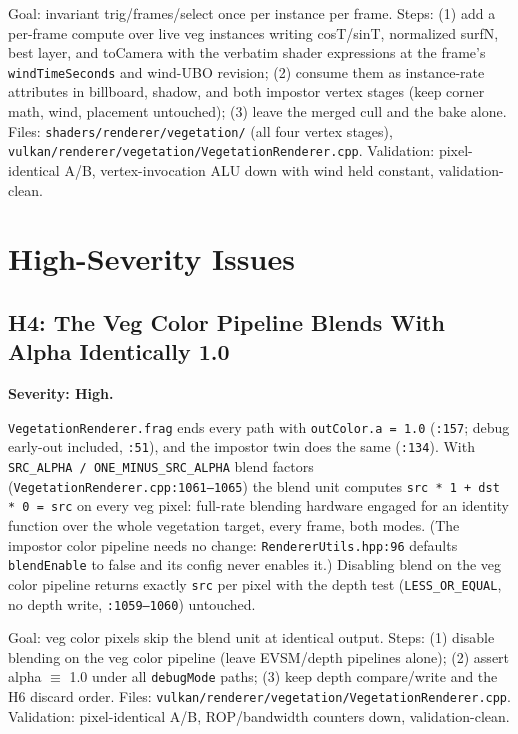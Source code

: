 \documentclass[11pt,a4paper]{article}
\begin{document}
\begin{tcolorbox}[promptbox={Prompt --- C3: per-instance vertex-invariant table}]
Goal: invariant trig/frames/select once per instance per frame. Steps:
(1) add a per-frame compute over live veg instances writing cosT/sinT,
normalized surfN, best layer, and toCamera with the verbatim shader
expressions at the frame's \texttt{windTimeSeconds} and wind-UBO revision;
(2) consume them as instance-rate attributes in billboard, shadow, and both
impostor vertex stages (keep corner math, wind, placement untouched);
(3) leave the merged cull and the bake alone. Files:
\texttt{shaders/renderer/vegetation/} (all four vertex stages),
\texttt{vulkan/renderer/vegetation/VegetationRenderer.cpp}. Validation:
pixel-identical A/B, vertex-invocation ALU down with wind held constant,
validation-clean.
\end{tcolorbox}

\section{High-Severity Issues}

\subsection{H4: The Veg Color Pipeline Blends With Alpha Identically 1.0}

\textbf{Severity: High.}

\texttt{VegetationRenderer.frag} ends every path with
\texttt{outColor.a = 1.0} (\texttt{:157}; debug early-out included,
\texttt{:51}), and the impostor twin does the same (\texttt{:134}). With
\texttt{SRC\_ALPHA / ONE\_MINUS\_SRC\_ALPHA} blend factors
(\texttt{VegetationRenderer.cpp:1061--1065}) the blend unit computes
\texttt{src * 1 + dst * 0 = src} on every veg pixel: full-rate blending
hardware engaged for an identity function over the whole vegetation target,
every frame, both modes. (The impostor color pipeline needs no change:
\texttt{RendererUtils.hpp:96} defaults \texttt{blendEnable} to false and
its config never enables it.) Disabling blend on the veg color pipeline
returns exactly \texttt{src} per pixel with the depth test
(\texttt{LESS\_OR\_EQUAL}, no depth write, \texttt{:1059--1060}) untouched.

\begin{tcolorbox}[promptbox={Prompt --- H4: unblend the veg color pipeline}]
Goal: veg color pixels skip the blend unit at identical output. Steps:
(1) disable blending on the veg color pipeline (leave EVSM/depth pipelines
alone); (2) assert alpha $\equiv$ 1.0 under all \texttt{debugMode} paths;
(3) keep depth compare/write and the H6 discard order. Files:
\texttt{vulkan/renderer/vegetation/VegetationRenderer.cpp}. Validation:
pixel-identical A/B, ROP/bandwidth counters down, validation-clean.
\end{tcolorbox}
\end{document}
